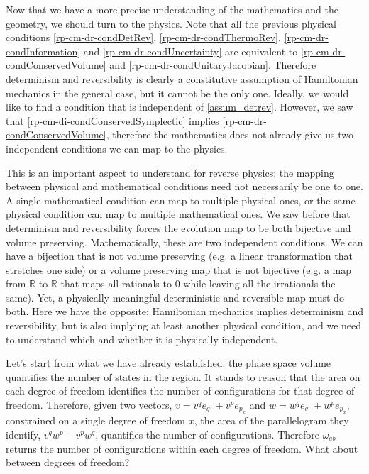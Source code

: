 Now that we have a more precise understanding of the mathematics and the geometry, we should turn to the physics. Note that all the previous physical conditions \ref{rp-cm-dr-condDetRev}, \ref{rp-cm-dr-condThermoRev}, \ref{rp-cm-dr-condInformation} and \ref{rp-cm-dr-condUncertainty} are equivalent to \ref{rp-cm-dr-condConservedVolume} and \ref{rp-cm-dr-condUnitaryJacobian}. Therefore determinism and reversibility is clearly a constitutive assumption of Hamiltonian mechanics in the general case, but it cannot be the only one. Ideally, we would like to find a condition that is independent of \ref{assum_detrev}. However, we saw that \ref{rp-cm-di-condConservedSymplectic} implies \ref{rp-cm-dr-condConservedVolume}, therefore the mathematics does not already give us two independent conditions we can map to the physics.

This is an important aspect to understand for reverse physics: the mapping between physical and mathematical conditions need not necessarily be one to one. A single mathematical condition can map to multiple physical ones, or the same physical condition can map to multiple mathematical ones. We saw before that determinism and reversibility forces the evolution map to be both bijective and volume preserving. Mathematically, these are two independent conditions. We can have a bijection that is not volume preserving (e.g. a linear transformation that stretches one side) or a volume preserving map that is not bijective (e.g. a map from $\mathbb{R}$ to $\mathbb{R}$ that maps all rationals to $0$ while leaving all the irrationals the same). Yet, a physically meaningful deterministic and reversible map must do both. Here we have the opposite: Hamiltonian mechanics implies determinism and reversibility, but is also implying at least another physical condition, and we need to understand which and whether it is physically independent.

Let's start from what we have already established: the phase space volume quantifies the number of states in the region. It stands to reason that the area on each degree of freedom identifies the number of configurations for that degree of freedom. Therefore, given two vectors, $v = v^q e_{q^x} + v^p e_{p_x}$ and $w = w^q e_{q^x} + w^p e_{p_x}$, constrained on a single degree of freedom $x$, the area of the parallelogram they identify, $v^q w^p - v^p w^q$, quantifies the number of configurations. Therefore $\omega_{ab}$ returns the number of configurations within each degree of freedom. What about between degrees of freedom?

